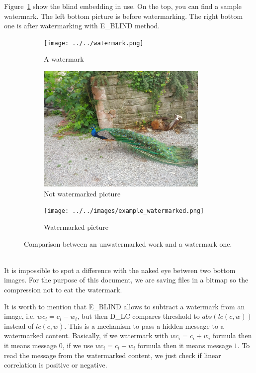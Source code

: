 \documentclass[a4paper,12pt]{article}
\begin{document}
Figure~\ref{fig:e-blind-example} show the blind embedding in use. On the top,
you can find a sample watermark. The left bottom picture is before watermarking.
The right bottom one is after watermarking with E\_BLIND method.
\begin{figure}[ht]
\begin{subfigure}{1.0\textwidth}
  \centering
    \texttt{[image: ../../watermark.png]}
  \caption*{A watermark}
\end{subfigure}
\begin{subfigure}{.5\textwidth}
  \centering
    \includegraphics[width=0.9\textwidth]{../../images/example.jpg}
  \caption*{Not watermarked picture}
\end{subfigure}
\begin{subfigure}{.5\textwidth}
  \centering
    \texttt{[image: ../../images/example\_watermarked.png]}
  \caption*{Watermarked picture}
\end{subfigure}
  \caption{Comparison between an unwatermarked work and a watermark one.}
  \label{fig:e-blind-example}
\end{figure}\\
It is impossible to spot a difference with the naked eye between two bottom
images. For the purpose of this document, we are saving
files in a bitmap so the compression not to eat the watermark.

It is worth to mention that E\_BLIND allows to subtract a watermark from
an image, i.e. $wc_i = c_i - w_i$, but then D\_LC compares threshold to
$abs(lc(c, w))$ instead of $lc(c, w)$. This is a mechanism to pass a hidden message to
a watermarked content. Basically, if we watermark with $wc_i = c_i + w_i$
formula then it means message $0$, if we use $wc_i = c_i - w_i$ formula then it means
message $1$. To read the message from the watermarked content, we just check if
linear correlation is positive or negative.
\end{document}
